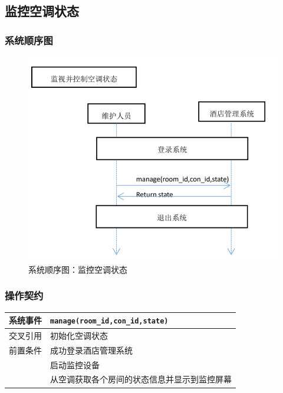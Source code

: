 \documentclass[black,normal,cn]{elegantnote}
\newcommand{\code}[1]{\colorbox{light-gray}{\texttt{#1}}}
\begin{document}
\subsection{监控空调状态}
\subsubsection{系统顺序图}

\begin{figure}[H]
    \centering
    \includegraphics[width=.8\textwidth]{fig/260003.png}
    \caption{系统顺序图：监控空调状态}
    \label{fig:260003}
\end{figure}

\subsubsection{操作契约}

\begin{center}
    \begin{tabular}{|>{\centering}m{}|m{}|}
        \hline
        系统事件                  & \multicolumn{1}{l|}{\code{manage(room\_id,con\_id,state)}} \\
        \hline
        交叉引用                  & 初始化空调状态                                             \\
        \hline
        前置条件                  & 成功登录酒店管理系统                                       \\
        \hline
        \multirow{2}{*}{后置条件} & 启动监控设备                                               \\
        \cline{2-2}
                                  & 从空调获取各个房间的状态信息并显示到监控屏幕               \\
        \hline
    \end{tabular}
\end{center}
\end{document}
